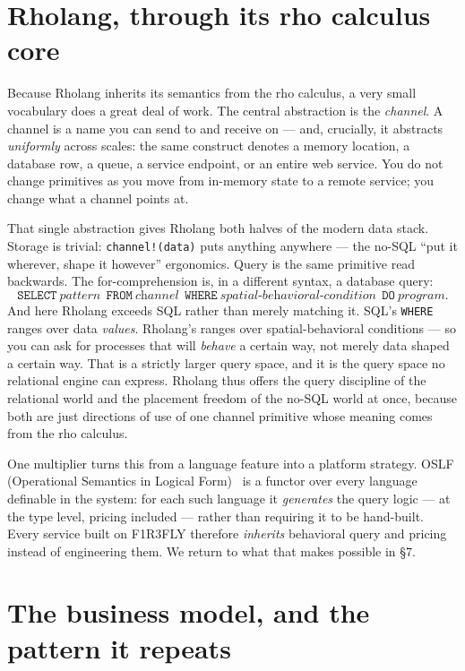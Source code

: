 \documentclass[11pt]{article}
\begin{document}
\section{Rholang, through its rho calculus core}

Because Rholang inherits its semantics from the rho calculus, a very small vocabulary does a great deal of work. The central abstraction is the \emph{channel}. A channel is a name you can send to and receive on --- and, crucially, it abstracts \emph{uniformly} across scales: the same construct denotes a memory location, a database row, a queue, a service endpoint, or an entire web service. You do not change primitives as you move from in-memory state to a remote service; you change what a channel points at.

That single abstraction gives Rholang both halves of the modern data stack. Storage is trivial: \texttt{channel!(data)} puts anything anywhere --- the no-SQL ``put it wherever, shape it however'' ergonomics. Query is the same primitive read backwards. The for-comprehension is, in a different syntax, a database query:
\[
\texttt{SELECT}\ \textit{pattern}\ \ \texttt{FROM}\ \textit{channel}\ \ \texttt{WHERE}\ \textit{spatial-behavioral-condition}\ \ \texttt{DO}\ \textit{program}.
\]
And here Rholang exceeds SQL rather than merely matching it. SQL's \texttt{WHERE} ranges over data \emph{values}. Rholang's ranges over spatial-behavioral conditions --- so you can ask for processes that will \emph{behave} a certain way, not merely data shaped a certain way. That is a strictly larger query space, and it is the query space no relational engine can express. Rholang thus offers the query discipline of the relational world and the placement freedom of the no-SQL world at once, because both are just directions of use of one channel primitive whose meaning comes from the rho calculus.

One multiplier turns this from a language feature into a platform strategy. OSLF (Operational Semantics in Logical Form)~\cite{namespaceLogic} is a functor over every language definable in the system: for each such language it \emph{generates} the query logic --- at the type level, pricing included --- rather than requiring it to be hand-built. Every service built on F1R3FLY therefore \emph{inherits} behavioral query and pricing instead of engineering them. We return to what that makes possible in \S7.

\section{The business model, and the pattern it repeats}
\end{document}
